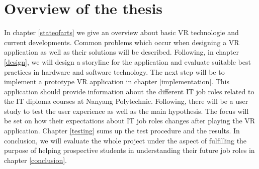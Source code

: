 \section{Overview of the thesis}
In chapter \ref{stateofarts} we give an overview about basic VR technologie and current developments. Common problems which occur when designing a VR application as well as their solutions will be described. Following, in chapter \ref{design}, we will design a storyline for the application and evaluate suitable best practices in hardware and software technology. The next step will be to implement a prototype VR application in chapter \ref{implementation}. This application should provide information about the different IT job roles related to the IT diploma courses at Nanyang Polytechnic. Following, there will be a user study to test the user experience as well as the main hypothesis. The focus will be set on how their expectations about IT job roles changes after playing the VR application. Chapter \ref{testing} sums up the test procedure and the results. In conclusion, we will evaluate the whole project under the aspect of fulfilling the purpose of helping prospective students in understanding their future job roles in chapter \ref{conclusion}.

